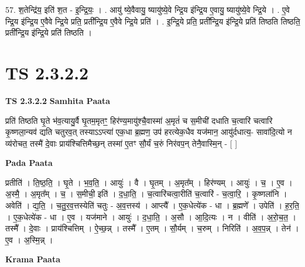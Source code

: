 \documentclass[17pt]{extarticle}
\begin{document}
57. श॒तेन्द्रि॑य॒ इति॑ श॒त - इ॒न्द्रि॒यः॒ । . आयु॑ ष्ये॒वैवायु॒ ष्यायु॑ष्ये॒वे न्द्रि॒य इ॑न्द्रि॒य ए॒वायु॒ ष्यायु॑ष्ये॒वे न्द्रि॒ये । . ए॒वे न्द्रि॒य इ॑न्द्रि॒य ए॒वैवे न्द्रि॒ये प्रति॒ प्रती᳚न्द्रि॒य ए॒वैवे न्द्रि॒ये प्रति॑ । . इ॒न्द्रि॒ये प्रति॒ प्रती᳚न्द्रि॒य इ॑न्द्रि॒ये प्रति॑ तिष्ठति तिष्ठति॒ प्रती᳚न्द्रि॒य इ॑न्द्रि॒ये प्रति॑ तिष्ठति । \newline
\pagebreak
{}
\section*{ TS 2.3.2.2 }

\textbf{TS 2.3.2.2 } \newline
\textbf{Samhita Paata} \newline

प्रति॑ तिष्ठति घृ॒ते भ॑व॒त्यायु॒र्वै घृ॒तम॒मृतꣳ॒॒ हिर॑ण्य॒मायु॑श्चै॒वास्मा॑ अ॒मृतं॑ च स॒मीची॑ दधाति च॒त्वारि॑ चत्वारि कृ॒ष्णला॒न्यव॑ द्यति चतुरव॒त् तस्याऽऽप्त्या॑ एक॒धा ब्र॒ह्मण॒ उप॑ हरत्येक॒धैव यज॑मान॒ आयु॑र्दधात्य॒- सावा॑दि॒त्यो न व्य॑रोचत॒ तस्मै॑ दे॒वाः प्राय॑श्चित्तिमैच्छ॒न् तस्मा॑ ए॒तꣳ सौ॒र्यं च॒रुं निर॑वप॒न् तेनै॒वास्मि॒न् - [  ] \newline

\textbf{Pada Paata} \newline

प्रतीति॑ । ति॒ष्ठ॒ति॒ । घृ॒ते । भ॒व॒ति॒ । आयुः॑ । वै । घृ॒तम् । अ॒मृत᳚म् । हिर॑ण्यम् । आयुः॑ । च॒ । ए॒व । अ॒स्मै॒ । अ॒मृत᳚म् । च॒ । स॒मीची॒ इति॑ । द॒धा॒ति॒ । च॒त्वारि॑चत्वा॒रीति॑ च॒त्वारि॑ - च॒त्वा॒रि॒ । कृ॒ष्णला॑नि । अवेति॑ । द्य॒ति॒ । च॒तु॒र॒व॒त्तस्येति॑ चतुः - अ॒व॒त्तस्य॑ । आप्त्यै᳚ । ए॒क॒धेत्ये॑क - धा । ब्र॒ह्मणे᳚ । उपेति॑ । ह॒र॒ति॒ । ए॒क॒धेत्ये॑क - धा । ए॒व । यज॑माने । आयुः॑ । द॒धा॒ति॒ । अ॒सौ । आ॒दि॒त्यः । न । वीति॑ । अ॒रो॒च॒त॒ । तस्मै᳚ । दे॒वाः । प्राय॑श्चित्तिम् । ऐ॒च्छ॒न्न् । तस्मै᳚ । ए॒तम् । सौ॒र्यम् । च॒रुम् । निरिति॑ । अ॒व॒प॒न्न् । तेन॑ । ए॒व । अ॒स्मि॒न्न् ।  \newline


\textbf{Krama Paata} \newline
\end{document}
